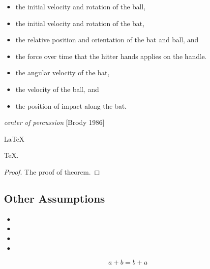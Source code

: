\documentclass{mcmthesis}
\begin{document}
\begin{itemize}
\item the initial velocity and rotation of the ball,
\item the initial velocity and rotation of the bat,
\item the relative position and orientation of the bat and ball, and
\item the force over time that the hitter hands applies on the handle.
\end{itemize}
\begin{itemize}
\item the angular velocity of the bat,
\item the velocity of the ball, and
\item the position of impact along the bat.
\end{itemize}
\emph{center of percussion} [Brody 1986]

\begin{Theorem} \label{thm:latex}
\LaTeX
\end{Theorem}
\begin{Lemma} \label{thm:tex}
\TeX .
\end{Lemma}
\begin{proof}
The proof of theorem.
\end{proof}

\subsection{Other Assumptions}
\begin{itemize}
\item
\item
\item
\item
\end{itemize}

\begin{center}
\end{center}

\begin{equation}
  a + b = b + a \label{eq:commutative}
\end {equation}
\end{document}
